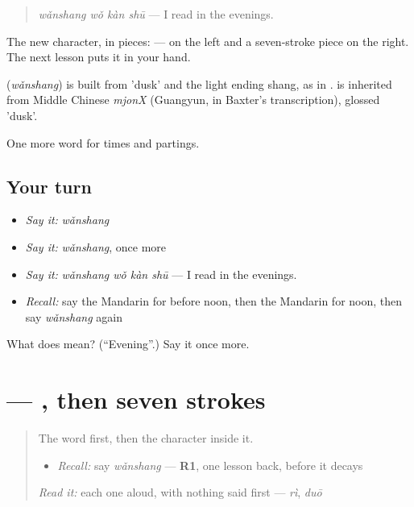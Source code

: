 \begin{quote}
\textbf{} \emph{wǎnshang wǒ kàn shū} — I read in the evenings.
\end{quote}

The new character, in pieces:  —  on the left and a seven-stroke piece on the right. The next lesson puts it in your hand.

\begin{cousinweb}
\textbf{} (\emph{wǎnshang}) is built from  'dusk' and the light ending shang, as in .  is inherited from Middle Chinese \emph{mjonX} (Guangyun, in Baxter's transcription), glossed 'dusk'.
\end{cousinweb}

\begin{grammarlens}[title={What you've built}]
One more word for times and partings.
\end{grammarlens}

\subsection*{Your turn}
\begin{itemize}
\raggedright
  \item \emph{Say it:} \emph{wǎnshang}
  \item \emph{Say it:} \emph{wǎnshang}, once more
  \item \emph{Say it:} \emph{wǎnshang wǒ kàn shū} — I read in the evenings.
  \item \emph{Recall:} say the Mandarin for before noon, then the Mandarin for noon, then say \emph{wǎnshang} again
\end{itemize}

\begin{tcolorbox}[breakable,colback=teal!4,colframe=teal!35!black,title={Before you move on}]
What does  mean? (\textquotedblleft{}Evening\textquotedblright{}.) Say it once more.
\end{tcolorbox}
\section[\texorpdfstring{\zh{晚} (wǎn)}{晚 (wǎn)}]{ — , then seven strokes}

\label{lesson:ZH-W49-wan}



\begin{quote}
The word first, then the character inside it.

\begin{itemize}
\raggedright
  \item \emph{Recall:} say \emph{wǎnshang} — \textbf{R1}, one lesson back, before it decays
\end{itemize}

\begin{quote}
 
\end{quote}

\emph{Read it:} each one aloud, with nothing said first — \emph{rì}, \emph{duō}
\end{quote}


